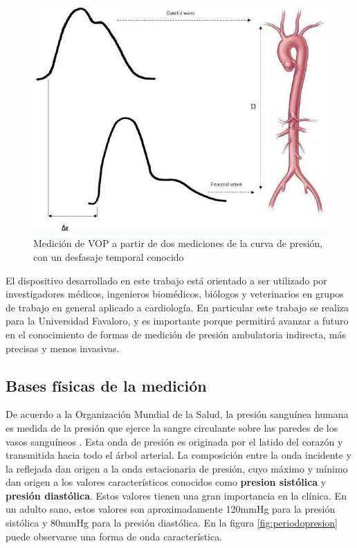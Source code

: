 \begin{figure}[!htbp]
	\centering
	\includegraphics[width=\textwidth]{./Figures/VOP.jpg}
	\caption{Medición de VOP a partir de dos mediciones de la curva de presión, con un desfasaje temporal conocido}
	\label{fig:vop}
\end{figure}

El dispositivo desarrollado en este trabajo está orientado a ser utilizado por investigadores médicos, ingenieros biomédicos, biólogos y veterinarios en grupos de trabajo en general aplicado a cardiología. En particular este trabajo se realiza para la Universidad Favaloro, y es importante porque permitirá avanzar a futuro en el conocimiento de formas de medición de presión ambulatoria indirecta, más precisas y menos invasivas.

\subsection{Bases físicas de la medición}

De acuerdo a la Organización Mundial de la Salud, la presión sanguínea humana es medida de la presión que ejerce la sangre circulante sobre las paredes de los vasos sanguíneos \cite{who2015}. Esta onda de presión es originada por el latido del corazón y transmitida hacia todo el árbol arterial. La composición entre la onda incidente y la reflejada dan origen a la onda estacionaria de presión, cuyo máximo y mínimo dan origen a los valores característicos conocidos como \textbf{presion sistólica} y \textbf{presión diastólica}. Estos valores tienen una gran importancia en la clínica. En un adulto sano, estos valores son aproximadamente 120mmHg para la presión sistólica y 80mmHg para la presión diastólica. En la figura \ref{fig:periodopresion} puede observarse una forma de onda característica.

